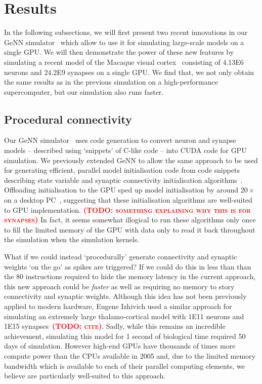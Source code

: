 \documentclass[9pt,twocolumn,twoside,lineno]{pnas-new}
\newcommand{\todo}[1]{\textbf{\textsc{\textcolor{red}{(TODO: #1)}}}}
\begin{document}
\section*{Results}
In the following subsections, we will first present two recent innovations in our GeNN simulator~\citep{Yavuz2016} which allow to use it for simulating large-scale models on a single GPU.
We will then demonstrate the power of these new features by simulating a recent model of the Macaque visual cortex~\citep{Schmidt2018} consisting of \num{4.13E6} neurons and \num{24.2E9} synapses on a single GPU.
We find that, we not only obtain the same results as in the previous simulation on a high-performance supercomputer, but our simulation also runs faster.

\subsection*{Procedural connectivity}
Our GeNN simulator~\citep{Yavuz2016} uses code generation to convert neuron and synapse models -- described using `snippets' of C-like code -- into CUDA code for GPU simulation.
We previously extended GeNN to allow the same approach to be used for generating efficient, parallel model initialisation code from code snippets describing state variable and synaptic connectivity initialisation algorithms~\citep{Knight2018}.
Offloading initialisation to the GPU sped up model initialisation by around $20\times$ on a desktop PC~\citep{Knight2018}, suggesting that these initialisation algorithms are well-suited to GPU implementation.
\todo{something explaining why this is for synapses}
In fact, it seems somewhat illogical to run these algorithms only once to fill the limited memory of the GPU with data only to read it back throughout the simulation when the simulation kernels.

What if we could instead `procedurally' generate connectivity and synaptic weights `on the go' as spikes are triggered?
If we could do this in less than than the 80 instructions required to hide the memory latency in the current approach, this new approach could be \emph{faster} as well as requiring no memory to story connectivity and synaptic weights.
Although this idea has not been previously applied to modern hardware, Eugene Izhivich used a similar approach for simulating an extremely large thalamo-cortical model with \num{1E11} neurons and \num{1E15} synapses~\todo{cite}.
Sadly, while this remains an incredible achievement, simulating this model for 1 second of biological time required 50 days of simulation.
However high-end GPUs have thousands of times more compute power than the CPUs available in 2005 and, due to the limited memory bandwidth which is available to each of their parallel computing elements, we believe are particularly well-suited to this approach.
\end{document}

